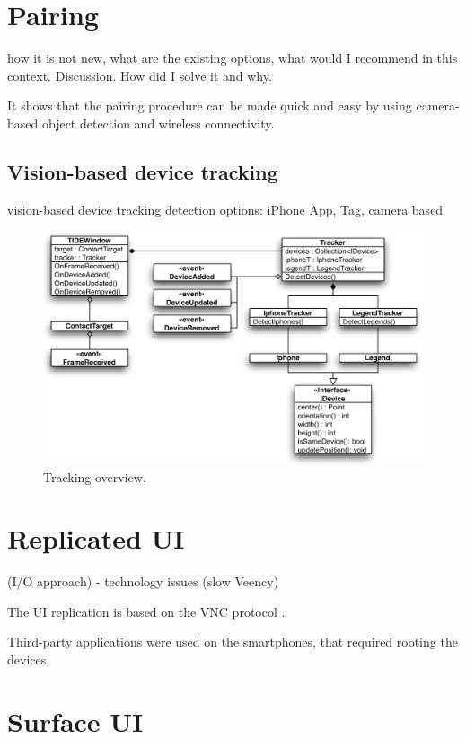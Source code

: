 \section{Pairing}
\label{sec:pairing}


how it is not new, what are the existing options, what would I recommend in this context. Discussion. How did I solve it and why.

It shows that the pairing procedure can be made quick and easy by using camera-based object detection and wireless connectivity.


\subsection{Vision-based device tracking}
vision-based device tracking
detection options: iPhone App, Tag, camera based 

\begin{figure}[htb]
  \centering
    \includegraphics[width=1\textwidth]{images/trackingDiagram}
    \caption{Tracking overview.}
    \label{fig:trackingDiagram}
\end{figure}

\section{Replicated UI}
\label{sec:replicatedui}

 (I/O approach)
- technology issues (slow Veency)

The UI replication is based on the VNC protocol \citep{Richardson:1998:vnc}.

Third-party applications were used on the smartphones, that required rooting the devices.


\section{Surface UI}
\label{sec:surfaceui}

